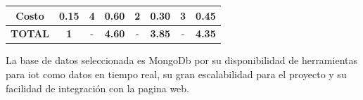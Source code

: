 \begin{tabla}[dat]
{\begin{tabular}{|c|c|c|c|c|c|c|c|}
\hline
Costo                                                                                                     & 0.15                                                                       & 4               & 0.60                 & 2               & 0.30                 & 3               & 0.45                  \\ 
\hline
\textbf{TOTAL}                                                                                            & \textbf{1}                                                                 & -               & \textbf{4.60}        & -               & \textbf{3.85}        & -               & \textbf{4.35}         \\
\hline
\end{tabular}
}
\end{tabla}
\newpage
La base de datos seleccionada es MongoDb por su disponibilidad de herramientas para \acrshort{iot} como datos en tiempo real, su gran escalabilidad para el proyecto y su facilidad de integración con la pagina web.
